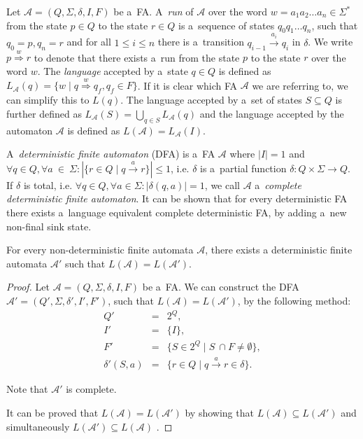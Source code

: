 Let $\mathcal{A} = (Q, \Sigma, \delta, I, F)$ be a~FA. A~\emph{run} of
$\mathcal{A}$ over the word $w = a_1a_2\ldots a_n \in \Sigma^*$ from the state
$p \in Q$ to the state $r \in Q$ is a~sequence of states $q_0q_1\ldots q_n$,
such that $q_0 = p, q_n = r$ and for all $1 \leq i \leq n$ there is a~transition
$q_{i-1} \overset{a_i}{\longrightarrow} q_i$ in $\delta$. We write $p
\overset{w}{\Longrightarrow} r$ to denote that there exists a~run from the state
$p$ to the state $r$ over the word $w$.
	\newpage
The \emph{language} accepted by a~state $q \in Q$ is defined as
$L_{\mathcal{A}}(q) = \{w \mid q \overset{w}{\Longrightarrow} q_f, q_f \in F\}$.
If it is clear which FA $\mathcal{A}$ we are referring to, we can simplify
this to $L(q)$. The language accepted by a~set of states $S \subseteq
Q$ is further defined as $L_{\mathcal{A}}(S) = \bigcup_{q \in S}
L_{\mathcal{A}}(q)$ and the language accepted by the automaton $\mathcal{A}$ is
defined as $L(\mathcal{A}) = L_{\mathcal{A}}(I)$.
	
A~\emph{deterministic finite automaton} (DFA) is a~FA $\mathcal{A}$ where $|I| =
1$ and $\forall q \in Q, \forall a~\in~\Sigma: |\{ r \in Q \mid q
\overset{a}{\longrightarrow} r\}| \leq 1$, i.e. $\delta$ is a~partial function
$\delta : Q \times \Sigma \longrightarrow Q$. If $\delta$ is total, i.e.
$\forall q \in Q, \forall a \in \Sigma : |\delta(q, a)| = 1$, we call
$\mathcal{A}$ a~\emph{complete deterministic finite automaton}. It can be shown
that for every deterministic FA there exists a~language equivalent complete
deterministic FA, by adding a~new non-final sink state.
	
	\begin{lemma}
For every non-deterministic finite automata $\mathcal{A}$, there exists a
deterministic finite automata $\mathcal{A}'$ such that $L(\mathcal{A}) =
L(\mathcal{A}')$.
	\end{lemma}
	
	\begin{proof}
	Let $\mathcal{A} = (Q, \Sigma, \delta, I, F)$ be a~FA. We can construct
	the DFA $\mathcal{A}'= (Q', \Sigma, \delta', I', F')$, such that
	$L(\mathcal{A}) = L(\mathcal{A}')$, by the following method:
	\begin{eqnarray*}
	 Q' & = & 2^Q,\\
	 I' & = & \{I\},\\
	 F' & = & \{S \in 2^Q \mid S~\cap F \neq \emptyset\},\\
	 \delta'(S, a) & = & \{r \in Q \mid q \overset{a}{\longrightarrow} r \in
	 \delta\}.
	\end{eqnarray*}
	
	Note that $\mathcal{A}'$ is complete.
	
	It can be proved that $L(\mathcal{A}) = L(\mathcal{A}')$ by showing that
	$L(\mathcal{A}) \subseteq L(\mathcal{A}')$ and simultaneously $L(\mathcal{A}')
	\subseteq L(\mathcal{A})$ \cite{tin}.
	\end{proof}
	

